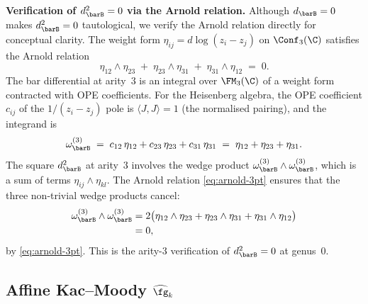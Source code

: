 \begin{example}
\smallskip\noindent
\textbf{Verification of $d_{\barB}^2 = 0$ via the Arnold relation.}
Although $d_{\barB} = 0$ makes $d_{\barB}^2 = 0$ tautological, we
verify the Arnold relation directly for conceptual clarity. The
weight form $\eta_{ij} = d\log(z_i - z_j)$ on $\Conf_3(\C)$
satisfies the Arnold relation
\begin{equation}\label{eq:arnold-3pt}
 \eta_{12}\wedge\eta_{23}
 \;+\;
 \eta_{23}\wedge\eta_{31}
 \;+\;
 \eta_{31}\wedge\eta_{12}
 \;=\; 0.
\end{equation}
The bar differential at arity~$3$ is an integral over $\FM_3(\C)$
of a weight form contracted with OPE coefficients. For the
Heisenberg algebra, the OPE coefficient $c_{ij}$ of the
$1/(z_i - z_j)$ pole is $\langle J, J\rangle = 1$ (the normalised
pairing), and the integrand is
\[
 \omega_{\barB}^{(3)}
 \;=\;
 c_{12}\,\eta_{12} + c_{23}\,\eta_{23} + c_{31}\,\eta_{31}
 \;=\;
 \eta_{12} + \eta_{23} + \eta_{31}.
\]
The square $d_{\barB}^2$ at arity~$3$ involves the wedge product
$\omega_{\barB}^{(3)} \wedge \omega_{\barB}^{(3)}$, which is a
sum of terms $\eta_{ij} \wedge \eta_{kl}$. The Arnold relation
\eqref{eq:arnold-3pt} ensures that the three non-trivial wedge
products cancel:
\begin{align*}
 \omega_{\barB}^{(3)} \wedge \omega_{\barB}^{(3)}
 &= 2\bigl(
 \eta_{12}\wedge\eta_{23}
 + \eta_{23}\wedge\eta_{31}
 + \eta_{31}\wedge\eta_{12}
 \bigr) \\
 &= 0,
\end{align*}
by \eqref{eq:arnold-3pt}. This is the arity-$3$ verification of
$d_{\barB}^2 = 0$ at genus~$0$.
\end{example}

\subsection{Affine Kac--Moody \texorpdfstring{$\widehat{\fg}_k$}{ĝ\_k}}
\label{subsec:affine-KM-SC}

